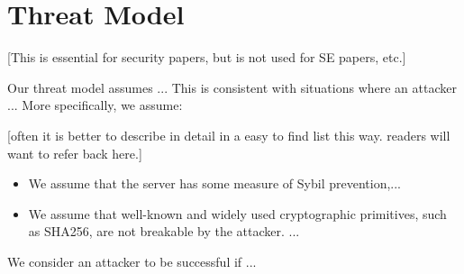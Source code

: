 \section{Threat Model}
\label{SEC:threat-model}
[This is essential for security papers, but is not used for SE papers, etc.]

Our threat model assumes ...
This is consistent with situations where an attacker ...
More specifically, we assume:

[often it is better to describe in detail in a easy to find list this way.
readers will want to refer back here.]
\begin{itemize}

    \item We assume that the server has some measure of Sybil prevention,...

    \item We assume that well-known and widely used cryptographic primitives,
        such as SHA256, are not breakable by the attacker. ...

\end{itemize}

We consider an attacker to be successful if ...

